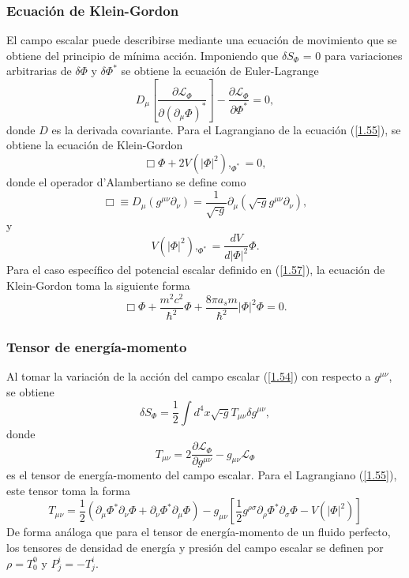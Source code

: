\documentclass[a4paper,openright,10pt, oneside, final]{book}
\begin{document}
\subsubsection{Ecuación de Klein-Gordon}
El campo escalar puede describirse mediante una ecuación de movimiento que se obtiene del principio de mínima acción. Imponiendo que $\delta S_{\Phi}$ = 0 para variaciones arbitrarias de $\delta \Phi$ y $\delta \Phi^{*}$ se obtiene la ecuación de Euler-Lagrange
\begin{equation}
D_{\mu}\left[\frac{\partial\mathcal{L}_{\Phi}}{\partial(\partial_{\mu}\Phi)^{*}}\right] - \frac{\partial\mathcal{L}_{\Phi}}{\partial\Phi^{*}} = 0,\label{1.58}
\end{equation}
donde $D$ es la derivada covariante. Para el Lagrangiano de la ecuación (\ref{1.55}), se obtiene la ecuación de Klein-Gordon
\begin{equation}
\Box\Phi + 2V(|\Phi|^{2}),_{\Phi^{*}} = 0,
\end{equation}
donde el operador d'Alambertiano se define como
\begin{equation}
\Box \equiv D_{\mu}(g^{\mu\nu}\partial_{\nu})
=
\frac{1}{\sqrt{\textbf{-}g}}\partial_{\mu}(\sqrt{\textbf{-}g}g^{\mu\nu}\partial_{\nu}),
\end{equation}
y
\begin{equation}
V(|\Phi|^{2}),_{\Phi^{*}} = \frac{d V}{d |\Phi|^{2}}\Phi.
\end{equation}
Para el caso específico del potencial escalar definido en (\ref{1.57}), la ecuación de Klein-Gordon toma la siguiente forma
\begin{equation}
\Box\Phi + \frac{m^{2}c^{2}}{\hbar^{2}}\Phi + \frac{8\pi a_{s}m}{\hbar^{2}}|\Phi|^{2}\Phi = 0.
\end{equation}
\subsubsection{Tensor de energía-momento}
Al tomar la variación de la acción del campo escalar (\ref{1.54}) con respecto a $g^{\mu\nu}$, se obtiene
\begin{equation}
\delta S_{\Phi} = \frac{1}{2} \int d^{4}x\sqrt{\textbf{-}g}T_{\mu\nu}\delta g^{\mu\nu},
\end{equation}
donde
\begin{equation}
T_{\mu\nu} = 2\frac{\partial\mathcal{L}_{\Phi}}{\partial g^{\mu\nu}} - g_{\mu\nu}\mathcal{L}_{\Phi}
\end{equation}
es el tensor de energía-momento del campo escalar. Para el Lagrangiano (\ref{1.55}), este tensor toma la forma
\begin{equation}
T_{\mu\nu} = \frac{1}{2}(\partial_{\mu}\Phi^{*}\partial_{\nu}\Phi + \partial_{\nu}\Phi^{*}\partial_{\mu}\Phi)
-
g_{\mu\nu}\left[
\frac{1}{2}g^{\rho\sigma}\partial_{\rho}\Phi^{*}\partial_{\sigma}\Phi
-
V(|\Phi|^{2})\right]
\end{equation}
De forma análoga que para el tensor de energía-momento de un fluido perfecto, los tensores de  densidad de energía y presión del campo escalar se definen por $\rho = T^{0}_{0}$ y $P^{i}_{j} = -T^{i}_{j}$.
\end{document}
